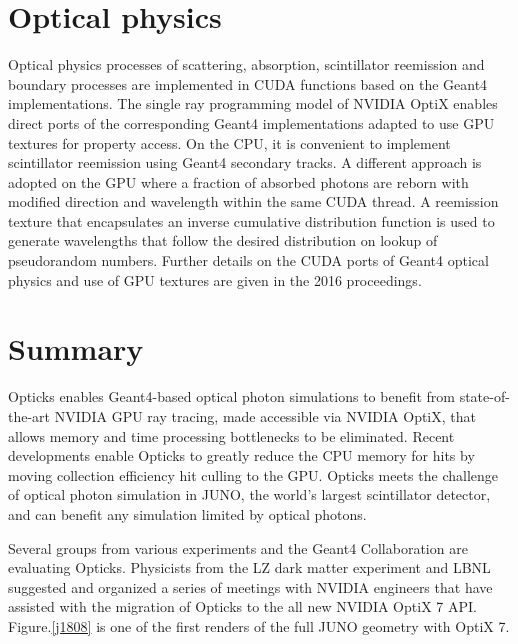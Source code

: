 \documentclass{webofc}
\begin{document}
\section{Optical physics}%
%
Optical physics processes of scattering, absorption, scintillator reemission and 
boundary processes are implemented in CUDA functions based on the Geant4
implementations. 
%
The single ray programming model of NVIDIA OptiX enables 
direct ports of the corresponding Geant4 implementations adapted
to use GPU textures for property access. 
%
On the CPU, it is convenient to implement scintillator reemission using Geant4 secondary 
tracks. A different approach is adopted on the GPU where a fraction of absorbed photons
are reborn with modified direction and wavelength within the same CUDA thread. 
A reemission texture that encapsulates an inverse cumulative distribution function 
is used to generate wavelengths that follow the desired distribution on lookup of pseudorandom numbers. 
%
Further details on the CUDA ports of Geant4 optical physics and use of GPU textures 
are given in the 2016 proceedings\cite{chep2016}.
%
%
%
%
\section{Summary}
%
Opticks enables Geant4-based optical photon simulations to benefit from 
state-of-the-art NVIDIA GPU ray tracing, made accessible via NVIDIA OptiX,
that allows memory and time processing bottlenecks to be eliminated.
Recent developments enable Opticks to greatly reduce the CPU memory for hits 
by moving collection efficiency hit culling to the GPU. 
Opticks meets the challenge of optical photon simulation in JUNO, 
the world's largest scintillator detector, and can benefit any simulation limited by optical photons. 

Several groups from various experiments and the Geant4 Collaboration are evaluating Opticks.
Physicists from the LZ dark matter experiment and LBNL suggested and 
organized a series of meetings with NVIDIA engineers that have assisted with the 
migration of Opticks to the all new NVIDIA OptiX 7 API. Figure.\ref{j1808} 
is one of the first renders of the full JUNO geometry with OptiX 7.
%
%
\newpage
\end{document}
